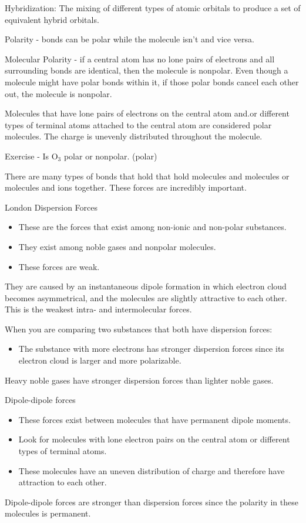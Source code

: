 \documentclass[../hchem.tex]{subfiles}
\begin{document}
Hybridization: The mixing of different types of atomic orbitals to produce a set of equivalent hybrid orbitals.

Polarity - bonds can be polar while the molecule isn't and vice versa.

Molecular Polarity - if a central atom has no lone pairs of electrons and all surrounding bonds are identical, then the molecule is nonpolar.
Even though a molecule might have polar bonds within it, if those polar bonds cancel each other out, the molecule is nonpolar.

Molecules that have lone pairs of electrons on the central atom and.or different types of terminal atoms attached to the central atom are considered polar molecules. The charge is unevenly distributed throughout the molecule.

Exercise - Is O$_3$ polar or nonpolar. (polar)

There are many types of bonds that hold that hold molecules and molecules or molecules and ions together. These forces are incredibly important.

London Dispersion Forces 
\begin{itemize}
    \item These are the forces that exist among non-ionic and non-polar substances. 
    \item They exist among noble gases and nonpolar molecules.
    \item These forces are weak.
\end{itemize}

They are caused by an instantaneous dipole formation in which electron cloud becomes asymmetrical, and the molecules are slightly attractive to each other.
This is the weakest intra- and intermolecular forces.

When you are comparing two substances that both have dispersion forces:
\begin{itemize}
    \item The substance with more electrons has stronger dispersion forces since its electron cloud is larger and more polarizable.
\end{itemize}
Heavy noble gases have stronger dispersion forces than lighter noble gases.

Dipole-dipole forces 
\begin{itemize}
    \item These forces exist between molecules that have permanent dipole moments.
    \item Look for molecules with lone electron pairs on the central atom or different types of terminal atoms.
    \item These molecules have an uneven distribution of charge and therefore have attraction to each other.
\end{itemize}
Dipole-dipole forces are stronger than dispersion forces since the polarity in these molecules is permanent.
\end{document}
